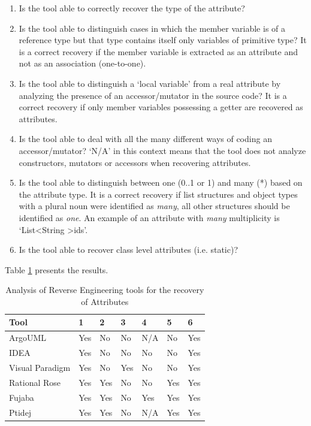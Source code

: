 \begin{enumerate}
\item Is the tool able to correctly recover the type of the attribute?

\item Is the tool able to distinguish cases in which the member variable is of a reference type but that type contains itself only variables of primitive type? It is a correct recovery if the member variable is extracted as an attribute and not as an association (one-to-one).

\item Is the tool able to distinguish a `local variable' from a real attribute by analyzing the presence of an accessor/mutator in the source code?  It is a correct recovery if only member variables possessing a getter are recovered as attributes. 

\item Is the tool able to deal with all the many different ways of coding an accessor/mutator? `N/A' in this context means that the tool does not analyze constructors, mutators or accessors when recovering attributes. 

\item Is the tool able to distinguish between one (0..1 or 1) and many (*) based on the attribute type. It is a correct recovery if list structures and object types with a plural noun were identified as \textit{many}, all other structures should be identified as \textit{one}. An example of an attribute with  \textit{many} multiplicity is `List\textless String \textgreater ids'.

\item Is the tool able to recover class level attributes (i.e. static)?
\end{enumerate}

Table \ref{table:analyzeAttributesSecondPart} presents the results.

\begin{table}[h]
\caption{Analysis of Reverse Engineering tools for the recovery of Attributes}
\label{table:analyzeAttributesSecondPart}
\centering
\begin{tabular}{lllllll}
\toprule
\rowcolor[HTML]{BBDAFF}
\textbf{Tool}   & \textbf{1}    & \textbf{2}   &  \textbf{3}   &  \textbf{4} &  \textbf{5}  &  \textbf{6} \\ 
\hline
ArgoUML & Yes & No & No & N/A & No & Yes\\ 
IDEA & Yes & No & No & No & No  & Yes\\ 
Visual Paradigm & Yes & No & Yes & No & No & Yes \\ 
Rational Rose & Yes & Yes & No & No & Yes & Yes\\ 
Fujaba & Yes & Yes & No & Yes & Yes & Yes\\ 
Ptidej & Yes & Yes & No & N/A & Yes & Yes\\ 
\hline
\end{tabular}
\end{table}

